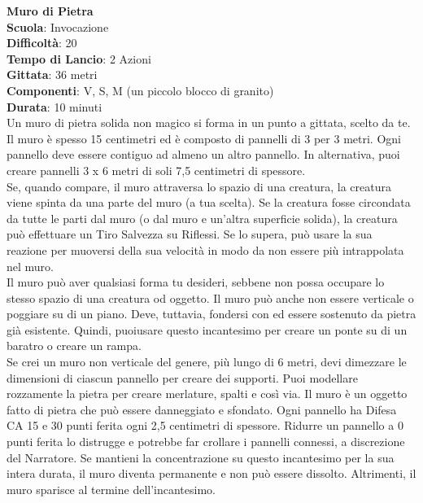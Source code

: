 \begin{multicols}{2}
\medskip\textbf{Muro di Pietra}\\
\textbf{Scuola}: Invocazione\\
\textbf{Difficoltà}:  20\\
\textbf{Tempo di Lancio}: 2 Azioni\\
\textbf{Gittata}: 36 metri\\
\textbf{Componenti}: V, S, M (un piccolo blocco di granito)\\
\textbf{Durata}: 10 minuti\\
Un muro di pietra solida non magico si forma in un punto a gittata, scelto da te. Il muro è spesso 15 centimetri ed è composto di pannelli di 3 per 3 metri. Ogni pannello deve essere contiguo ad almeno un altro pannello. In alternativa, puoi creare pannelli 3 x 6 metri di soli 7,5 centimetri di spessore.\\
Se, quando compare, il muro attraversa lo spazio di una creatura, la creatura viene spinta da una parte del muro (a tua scelta). Se la creatura fosse circondata da tutte le parti dal muro (o dal muro e un'altra superficie solida), la creatura può effettuare un Tiro Salvezza su Riflessi. Se lo supera, può usare la sua reazione per muoversi della sua velocità in modo da non essere più intrappolata nel muro.\\
Il muro può aver qualsiasi forma tu desideri, sebbene non possa occupare lo stesso spazio di una creatura od oggetto. Il muro può anche non essere verticale o poggiare su di un piano. Deve, tuttavia, fondersi con ed essere sostenuto da pietra già esistente. Quindi, puoiusare questo  incantesimo per creare un ponte su di un baratro o creare un rampa.\\
Se crei un muro non verticale del genere, più lungo di 6 metri, devi dimezzare le dimensioni di ciascun pannello per creare dei supporti. Puoi modellare rozzamente la pietra per creare merlature, spalti e così via. Il muro è un oggetto fatto di pietra che può essere danneggiato e sfondato. Ogni pannello ha Difesa CA 15 e 30 punti ferita ogni 2,5 centimetri di spessore. Ridurre un pannello a 0 punti ferita lo distrugge e potrebbe far crollare i pannelli connessi, a discrezione del Narratore. Se mantieni la concentrazione su questo incantesimo per la sua intera durata, il muro diventa permanente e non può essere dissolto. Altrimenti, il muro sparisce al termine dell'incantesimo.


\end{multicols}
